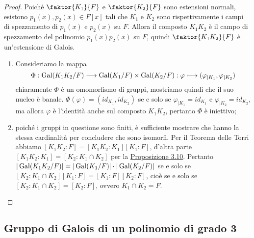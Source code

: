 \documentclass[11pt]{scrartcl}
\begin{document}
\begin{proof}
    Poiché $\faktor{K_1}{F}$ e $\faktor{K_2}{F}$ sono estensioni normali, esistono $p_1(x), p_2(x) \in F[x]$ tali che $K_1$ e $K_2$ 
    sono rispettivamente i campi di spezzamento di $p_1(x)$ e $p_2(x)$ su $F$. Allora il composto $K_1K_2$ è il campo di spezzamento  
    del polinomio $p_1(x)p_2(x)$ su $F$, quindi $\faktor{K_1K_2}{F}$ è un'estensione di Galois.
    \begin{enumerate}[(1)]
        \item Consideriamo la mappa
        \[
            \Phi: \operatorname{Gal}(K_1K_2/F)\longrightarrow \operatorname{Gal}(K_1/F)\times \operatorname{Gal}(K_2/F): \varphi\longmapsto (\varphi_{\mid K_1}, \varphi_{\mid K_2})
        \]
        chiaramente $\Phi$ è un omomorfismo di gruppi, mostriamo quindi che il suo nucleo è banale. $\Phi(\varphi) = (id_{K_1}, id_{K_2})$
        se e solo se $\varphi_{\mid K_1} = id_{K_1}$ e $\varphi_{\mid K_2} = id_{K_2}$, ma allora $\varphi$ è l'identità anche sul composto
        $K_1K_2$, pertanto $\Phi$ è iniettivo;
        \item poiché i gruppi in questione sono finiti, è sufficiente mostrare che hanno la stessa cardinalità per concludere che sono isomorfi.
        Per il Teorema delle Torri abbiamo $[K_1K_2:F] = [K_1K_2:K_1][K_1:F]$, d'altra parte $[K_1K_2:K_1] = [K_2:K_1\cap K_2]$ per
        la \hyperref[prop3.10]{Proposizione 3.10}. Pertanto $|\operatorname{Gal}(K_1K_2/F)| = |\operatorname{Gal}(K_1/F)|\cdot |\operatorname{Gal}(K_2/F)|$ 
        se e solo se $[K_2:K_1\cap K_2][K_1:F] = [K_1:F][K_2:F]$, cioè se e solo se $[K_2:K_1\cap K_2] = [K_2:F]$, ovvero $K_1\cap K_2 = F$.
    \end{enumerate}
\end{proof}

\newpage

\subsection{Gruppo di Galois di un polinomio di grado 3}
\end{document}
